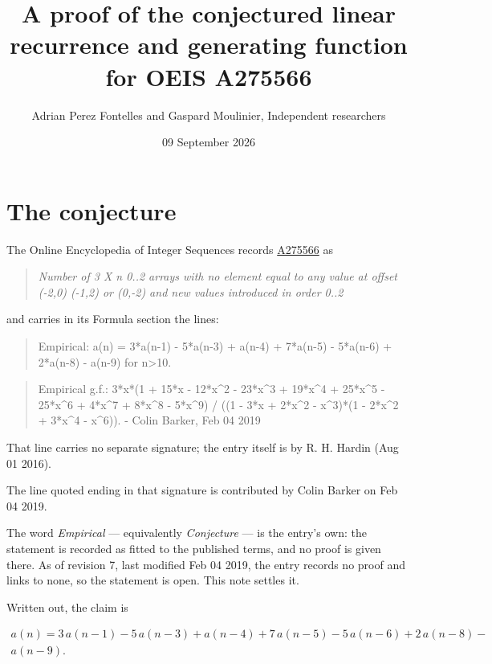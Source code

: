 \documentclass[11pt]{article}
\title{A proof of the conjectured linear recurrence and generating function for OEIS A275566}
\author{Adrian Perez Fontelles and Gaspard Moulinier, Independent researchers}
\date{09 September 2026}
\theoremstyle{definition}
\begin{document}
\maketitle
\section{The conjecture}

The Online Encyclopedia of Integer Sequences records \href{https://oeis.org/A275566}{A275566} as

\begin{quote}\itshape Number of 3 X n 0..2 arrays with no element equal to any value at offset (-2,0) (-1,2) or (0,-2) and new values introduced in order 0..2\end{quote}

and carries in its Formula section the lines:

\begin{quote}\ttfamily Empirical: a(n) = 3*a(n-1) - 5*a(n-3) + a(n-4) + 7*a(n-5) - 5*a(n-6) + 2*a(n-8) - a(n-9) for n>10.\end{quote}

\begin{quote}\ttfamily Empirical g.f.: 3*x*(1 + 15*x - 12*x\textasciicircum{}2 - 23*x\textasciicircum{}3 + 19*x\textasciicircum{}4 + 25*x\textasciicircum{}5 - 25*x\textasciicircum{}6 + 4*x\textasciicircum{}7 + 8*x\textasciicircum{}8 - 5*x\textasciicircum{}9) / ((1 - 3*x + 2*x\textasciicircum{}2 - x\textasciicircum{}3)*(1 - 2*x\textasciicircum{}2 + 3*x\textasciicircum{}4 - x\textasciicircum{}6)). - Colin Barker, Feb 04 2019\end{quote}

That line carries no separate signature; the entry itself is by R. H. Hardin (Aug 01 2016).

The line quoted ending in that signature is contributed by Colin Barker on Feb 04 2019.

The word {\itshape Empirical} --- equivalently {\itshape Conjecture} --- is the entry's own: the statement is recorded as fitted to the published terms, and no proof is given there. As of revision 7, last modified Feb 04 2019, the entry records no proof and links to none, so the statement is open. This note settles it.

Written out, the claim is

\begin{multline*} a(n) = 3\,a(n-1) - 5\,a(n-3) + a(n-4) + 7\,a(n-5) - 5\,a(n-6) + 2\,a(n-8) - \\ a(n-9). \end{multline*}
\end{document}
